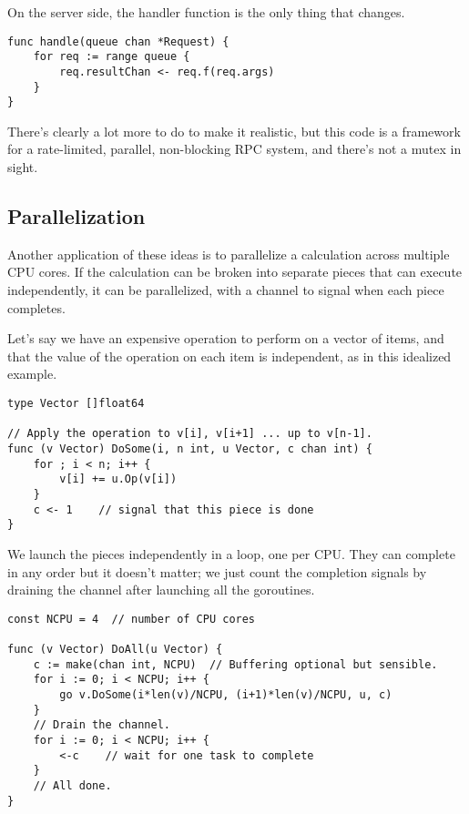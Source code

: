 On the server side, the handler function is the only thing that changes.

\begin{Verbatim}[frame=single]
func handle(queue chan *Request) {
    for req := range queue {
        req.resultChan <- req.f(req.args)
    }
}
\end{Verbatim}

There's clearly a lot more to do to make it realistic, but this code is
a framework for a rate-limited, parallel, non-blocking RPC system, and
there's not a mutex in sight.

\subsection*{Parallelization}

Another application of these ideas is to parallelize a calculation
across multiple CPU cores. If the calculation can be broken into
separate pieces that can execute independently, it can be parallelized,
with a channel to signal when each piece completes.

Let's say we have an expensive operation to perform on a vector of
items, and that the value of the operation on each item is independent,
as in this idealized example.

\begin{Verbatim}[frame=single]
type Vector []float64

// Apply the operation to v[i], v[i+1] ... up to v[n-1].
func (v Vector) DoSome(i, n int, u Vector, c chan int) {
    for ; i < n; i++ {
        v[i] += u.Op(v[i])
    }
    c <- 1    // signal that this piece is done
}
\end{Verbatim}

We launch the pieces independently in a loop, one per CPU. They can
complete in any order but it doesn't matter; we just count the
completion signals by draining the channel after launching all the
goroutines.

\begin{Verbatim}[frame=single]
const NCPU = 4  // number of CPU cores

func (v Vector) DoAll(u Vector) {
    c := make(chan int, NCPU)  // Buffering optional but sensible.
    for i := 0; i < NCPU; i++ {
        go v.DoSome(i*len(v)/NCPU, (i+1)*len(v)/NCPU, u, c)
    }
    // Drain the channel.
    for i := 0; i < NCPU; i++ {
        <-c    // wait for one task to complete
    }
    // All done.
}
\end{Verbatim}

